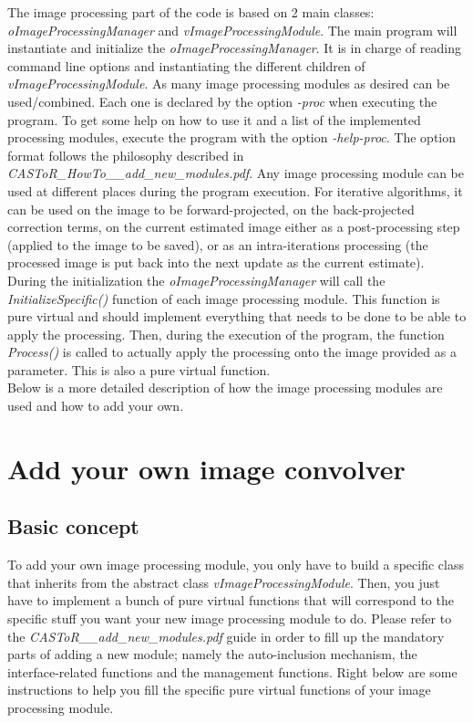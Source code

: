 \documentclass[a4paper, 11pt]{article}
\begin{document}
The image processing part of the code is based on 2 main classes: \textit{oImageProcessingManager} and \textit{vImageProcessingModule}. The main program will instantiate
and initialize the \textit{oImageProcessingManager}. It is in charge of reading command line options and instantiating the different children of \textit{vImageProcessingModule}.
As many image processing modules as desired can be used/combined. Each one is declared by the option \textit{-proc} when executing the program. To get some help on how to use it and a list of the
implemented processing modules, execute the program with the option \textit{-help-proc}. The option format follows the philosophy described in
\textit{CASToR\_HowTo\_\_add\_new\_modules.pdf}. Any image processing module can be used at different places during the program execution. For iterative algorithms,
it can be used on the image to be forward-projected, on the back-projected correction terms, on the current estimated image either as a post-processing step (applied
to the image to be saved), or as an intra-iterations processing (the processed image is put back into the next update as the current estimate).\\

During the initialization the \textit{oImageProcessingManager} will call the \textit{InitializeSpecific()} function of each image processing module. This function is pure
virtual and should implement everything that needs to be done to be able to apply the processing. Then, during the execution of the program, the function \textit{Process()}
is called to actually apply the processing onto the image provided as a parameter. This is also a pure virtual function.\\

Below is a more detailed description of how the image processing modules are used and how to add your own.

\section{Add your own image convolver}

\subsection{Basic concept}

To add your own image processing module, you only have to build a specific class that inherits from the abstract class \textit{vImageProcessingModule}. Then, you just
have to implement a bunch of pure virtual functions that will correspond to the specific stuff you want your new image processing module to do. Please refer to the
\textit{CASToR\_\_add\_new\_modules.pdf} guide in order to fill up the mandatory parts of adding a new module; namely the auto-inclusion mechanism, the
interface-related functions and the management functions. Right below are some instructions to help you fill the specific pure virtual functions of your image processing
module.\\
\end{document}
